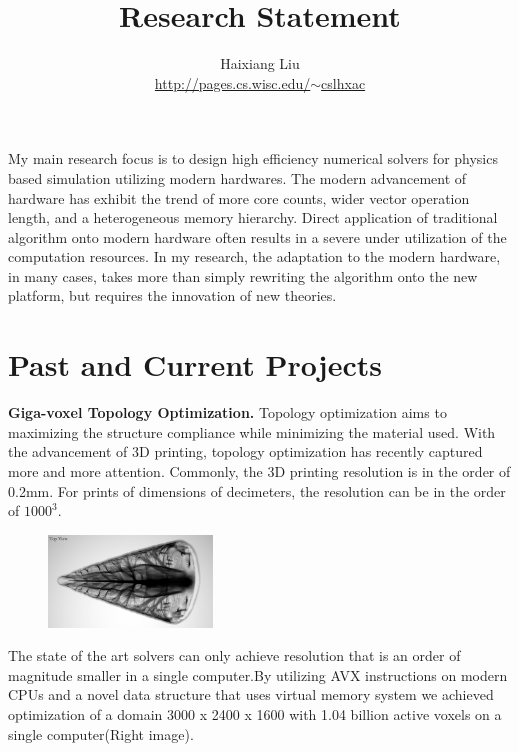 \documentclass[11pt]{article}
\begin{document}
\title{Research Statement}
\author{Haixiang Liu\\\href{http://pages.cs.wisc.edu/~cslhxac}{http://pages.cs.wisc.edu/$\sim$cslhxac}}
\maketitle
My main research focus is to design high efficiency numerical solvers for physics based simulation utilizing modern hardwares. The modern advancement of hardware has exhibit the trend of more core counts, wider vector operation length, and a heterogeneous memory hierarchy. Direct application of traditional algorithm onto modern hardware often results in a severe under utilization of the computation resources. In my research, the adaptation to the modern hardware, in many cases, takes more than simply rewriting the algorithm onto the new platform, but requires the innovation of new theories.
\section*{Past and Current Projects}
\textbf{Giga-voxel Topology Optimization.} Topology optimization aims to maximizing the structure compliance while minimizing the material used. With the advancement of 3D printing, topology optimization has recently captured more and more attention. Commonly, the 3D printing resolution is in the order of 0.2mm. For prints of dimensions of decimeters, the resolution can be in the order of $1000^3$.  

\begin{figure}
\includegraphics[width=0.39\textwidth]{Beak}
\end{figure}
The state of the art solvers can only achieve resolution that is an order of magnitude smaller in a single computer.By utilizing AVX instructions on modern CPUs and a novel data structure that uses virtual memory system we achieved optimization of a domain 3000 x 2400 x 1600 with 1.04 billion active voxels on a single computer(Right image)\cite{TopOptimization}.
\end{document}

